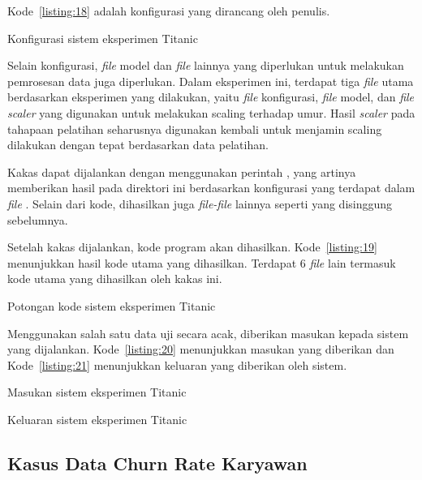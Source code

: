Kode~\ref{listing:18} adalah konfigurasi yang dirancang oleh penulis.

\begin{code}
	\caption{Konfigurasi sistem eksperimen Titanic}\label{listing:18}
\end{code}

Selain konfigurasi, \textit{file} model dan \textit{file} lainnya yang diperlukan untuk melakukan pemrosesan data juga diperlukan.
Dalam eksperimen ini, terdapat tiga \textit{file} utama berdasarkan eksperimen yang dilakukan, yaitu \textit{file} konfigurasi, \textit{file} model, dan \textit{file scaler}  yang digunakan untuk melakukan scaling terhadap umur.
Hasil \textit{scaler} pada tahapaan pelatihan seharusnya digunakan kembali untuk menjamin scaling dilakukan dengan tepat berdasarkan data pelatihan.

Kakas dapat dijalankan dengan menggunakan perintah , yang artinya memberikan hasil pada direktori ini berdasarkan konfigurasi yang terdapat dalam \textit{file} .
Selain dari kode, dihasilkan juga \textit{file-file} lainnya seperti yang disinggung sebelumnya.

Setelah kakas dijalankan, kode program akan dihasilkan.
Kode~\ref{listing:19} menunjukkan hasil kode utama yang dihasilkan.
Terdapat 6 \textit{file} lain termasuk kode utama yang dihasilkan oleh kakas ini.

\begin{code}
	\caption{Potongan kode sistem eksperimen Titanic}\label{listing:19}
\end{code}

Menggunakan salah satu data uji secara acak, diberikan masukan kepada sistem yang dijalankan.
Kode~\ref{listing:20} menunjukkan masukan yang diberikan dan Kode~\ref{listing:21} menunjukkan keluaran yang diberikan oleh sistem.

\begin{code}
	\caption{Masukan sistem eksperimen Titanic}\label{listing:20}
\end{code}

\begin{code}
	\caption{Keluaran sistem eksperimen Titanic}\label{listing:21}
\end{code}

\subsection{Kasus Data Churn Rate Karyawan}

